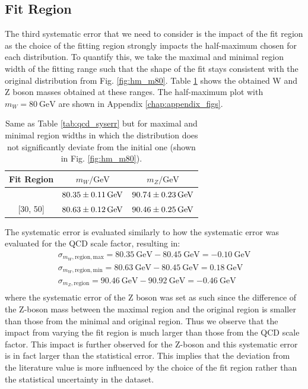 \documentclass[a4paper]{report}
\numberwithin{equation}{section}
\begin{document}
\subsection{Fit Region}

The third systematic error that we need to consider is the impact of the fit region as the choice of the fitting region 
strongly impacts the half-maximum chosen for each distribution. To quantify this, we take the maximal and minimal 
region width of the fitting range such that the shape of the fit stays consistent with the original distribution from 
Fig. \ref{fig:hm_m80}. Table \ref{tab:fitregion_syserr} shows the obtained W and Z boson masses obtained at these ranges. 
The half-maximum plot with $m_W = \SI{80}{\giga\electronvolt}$ are shown in Appendix \ref{chap:appendix_figs}.

\begin{table}
    \centering
    \begin{tabular}{|c|c|c|} \hline
    Fit Region &  $m_W / \si{\giga\electronvolt}$ & $m_Z / \si{\giga\electronvolt}$ \\ \hline
    [26, 65] & $\SI{80.35 \pm 0.11 }{\giga\electronvolt}$ & $\SI{90.74 \pm 0.23}{\giga\electronvolt}$ \\ 
    {[}30, 50{]} & $\SI{80.63 \pm 0.12 }{\giga\electronvolt}$ & $\SI{90.46 \pm 0.25}{\giga\electronvolt}$ \\ \hline 
    \end{tabular}
    \caption{Same as Table \ref{tab:qcd_syserr} but for maximal and minimal region widths in which the distribution 
    does not significantly deviate from the initial one (shown in Fig. \ref{fig:hm_m80}).}
    \label{tab:fitregion_syserr}
\end{table}
The systematic error is evaluated similarly to how the systematic error was evaluated for the QCD scale factor, resulting in:
\begin{align}
    \sigma_{m_W, \mathrm{region, max}} = \SI{80.35}{\giga\electronvolt} - \SI{80.45}{\giga\electronvolt} = -\SI{0.10}{\giga\electronvolt} \\
    \sigma_{m_W, \mathrm{region, min}} = \SI{80.63}{\giga\electronvolt} - \SI{80.45}{\giga\electronvolt} = \SI{0.18}{\giga\electronvolt} \\
    \sigma_{m_Z, \mathrm{region}} = \SI{90.46}{\giga\electronvolt} - \SI{90.92}{\giga\electronvolt} = -\SI{0.46}{\giga\electronvolt} \\
\end{align}
where the systematic error of the Z boson was set as such since the difference of the Z-boson mass between the maximal
 region and the original region is smaller than those from the minimal and original region. Thus we observe that the impact from 
 varying the fit region is much larger than those from the QCD scale factor. This impact is further observed for the Z-boson and 
 this systematic error is in fact larger than the statistical error. This implies that the deviation from the literature value 
 is more influenced by the choice of the fit region rather than the statistical uncertainty in the dataset.
\end{document}
